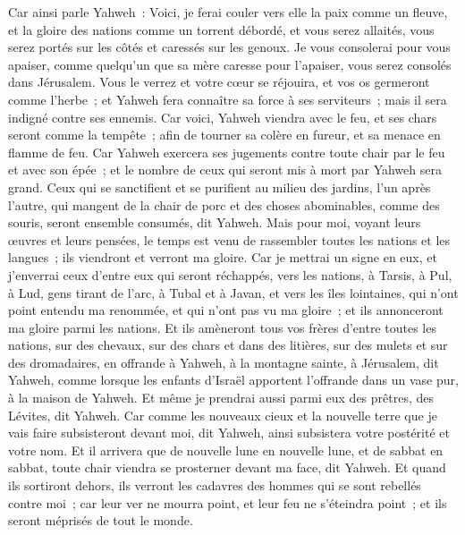 \begin{multicols}{2}
Car ainsi parle Yahweh~: Voici, je ferai couler vers elle la paix comme un fleuve, et la gloire des nations comme un torrent débordé, et vous serez allaités, vous serez portés sur les côtés et caressés sur les genoux.
Je vous consolerai pour vous apaiser, comme quelqu'un que sa mère caresse pour l'apaiser, vous serez consolés dans Jérusalem.
Vous le verrez et votre cœur se réjouira, et vos os germeront comme l'herbe~; et Yahweh fera connaître sa force à ses serviteurs~; mais il sera indigné contre ses ennemis.
Car voici, Yahweh viendra avec le feu, et ses chars seront comme la tempête~; afin de tourner sa colère en fureur, et sa menace en flamme de feu.
Car Yahweh exercera ses jugements contre toute chair par le feu et avec son épée~; et le nombre de ceux qui seront mis à mort par Yahweh sera grand.
Ceux qui se sanctifient et se purifient au milieu des jardins, l'un après l'autre, qui mangent de la chair de porc et des choses abominables, comme des souris, seront ensemble consumés, dit Yahweh.
Mais pour moi, voyant leurs œuvres et leurs pensées, le temps est venu de rassembler toutes les nations et les langues~; ils viendront et verront ma gloire.
Car je mettrai un signe en eux, et j'enverrai ceux d'entre eux qui seront réchappés, vers les nations, à Tarsis, à Pul, à Lud, gens tirant de l'arc, à Tubal et à Javan, et vers les îles lointaines, qui n'ont point entendu ma renommée, et qui n'ont pas vu ma gloire~; et ils annonceront ma gloire parmi les nations.
Et ils amèneront tous vos frères d'entre toutes les nations, sur des chevaux, sur des chars et dans des litières, sur des mulets et sur des dromadaires, en offrande à Yahweh, à la montagne sainte, à Jérusalem, dit Yahweh, comme lorsque les enfants d'Israël apportent l'offrande dans un vase pur, à la maison de Yahweh.
Et même je prendrai aussi parmi eux des prêtres, des Lévites, dit Yahweh.
Car comme les nouveaux cieux et la nouvelle terre que je vais faire subsisteront devant moi, dit Yahweh, ainsi subsistera votre postérité et votre nom.
Et il arrivera que de nouvelle lune en nouvelle lune, et de sabbat en sabbat, toute chair viendra se prosterner devant ma face, dit Yahweh.
Et quand ils sortiront dehors, ils verront les cadavres des hommes qui se sont rebellés contre moi~; car leur ver ne mourra point, et leur feu ne s'éteindra point~; et ils seront méprisés de tout le monde.
\PPE{}
\end{multicols}
